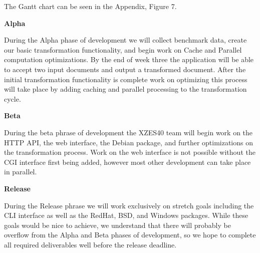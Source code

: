 The Gantt chart can be seen in the Appendix, Figure 7.

\textbf{Alpha}

During the Alpha phase of development we will collect benchmark data, create our basic transformation functionality, and begin work on Cache and Parallel computation optimizations.
By the end of week three the application will be able to accept two input documents and output a transformed document.
After the initial transformation functionality is complete work on optimizing this process will take place by adding caching and parallel processing to the transformation cycle.

\textbf{Beta}

During the beta phrase of development the XZES40 team will begin work on the HTTP API, the web interface, the Debian package, and further optimizations on the transformation process.
Work on the web interface is not possible without the CGI interface first being added, however most other development can take place in parallel.

\textbf{Release}

During the Release phrase we will work exclusively on stretch goals including the CLI interface as well as the RedHat, BSD, and Windows packages.
While these goals would be nice to achieve, we understand that there will probably be overflow from the Alpha and Beta phases of development, so we hope to complete all required deliverables well before the release deadline.


